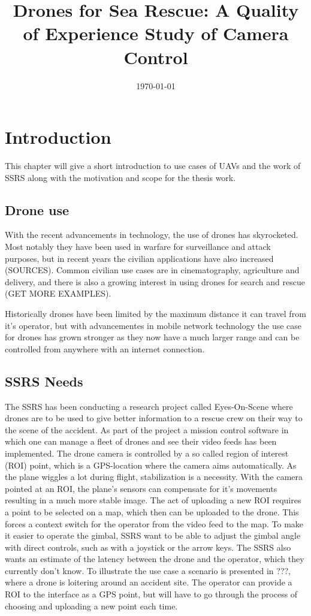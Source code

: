 \documentclass[nofilelist]{cslthse-msc}
\title{Drones for Sea Rescue: A Quality of Experience Study of Camera Control}
\date{\today}
\begin{document}
\renewcommand{\bibname}{References}

\makefrontmatter
\chapter{Introduction}
This chapter will give a short introduction to use cases of UAVs and the work of SSRS along with the motivation and scope for the thesis work.

\section{Drone use}
With the recent advancements in technology, the use of drones has skyrocketed. Most notably they have been used in warfare for surveillance and attack purposes, but in recent years the civilian applications have also increased (SOURCES). Common civilian use cases are in cinematography, agriculture and delivery, and there is also a growing interest in using drones for search and rescue (GET MORE EXAMPLES). 

Historically drones have been limited by the maximum distance it can travel from it's operator, but with advancementes in mobile network technology the use case for drones has grown stronger as they now have a much larger range and can be controlled from anywhere with an internet connection.   

\section{SSRS Needs}
The SSRS has been conducting a research project called Eyes-On-Scene where drones are to be used to give better information to a rescue crew on their way to the scene of the accident. As part of the project a mission control software in which one can manage a fleet of drones and see their video feeds has been implemented. The drone camera is controlled by a so called region of interest (ROI) point, which is a GPS-location where the camera aims automatically. As the plane wiggles a lot during flight, stabilization is a necessity. With the camera pointed at an ROI, the plane's sensors can compensate for it's movements resulting in a much more stable image.
The act of uploading a new ROI requires a point to be selected on a map, which then can be uploaded to the drone. This forces a context switch for the operator from the video feed to the map. To make it easier to operate the gimbal, SSRS want to be able to adjust the gimbal angle with direct controls, such as with a joystick or the arrow keys. The SSRS also wants an estimate of the latency between the drone and the operator, which they currently don't know.
To illustrate the use case a scenario is presented in ???, where a drone is loitering around an accident site. The operator can provide a ROI to the interface as a GPS point, but will have to go through the process of choosing and uploading a new point each time.
\end{document}
